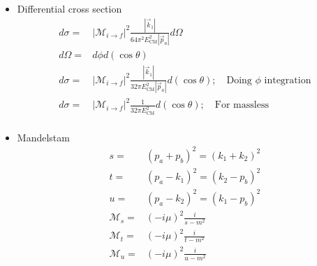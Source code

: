 \begin{itemize}
\begin{itemize}
            \item Differential cross section \cite{wells}
            \begin{equation}\begin{split}
            d\sigma=&|\mathcal{M}_{i\to f}|^2\frac{|\vec{k}_1|}{64\pi^2E^2_\text{CM}|\vec{p}_a|}d\Omega \\
            d\Omega=&d\phi d(\cos{\theta}) \\
            d\sigma=&|\mathcal{M}_{i\to f}|^2\frac{|\vec{k}_1|}{32\pi E^2_\text{CM}|\vec{p}_a|}d(\cos\theta)  ; \quad\text{Doing $\phi$ integration} \\
            d\sigma=&|\mathcal{M}_{i\to f}|^2\frac{1}{32\pi E^2_\text{CM}}d(\cos\theta) ; \quad\text{For massless} \\
            \end{split}\end{equation}
            \item Mandelstam \cite{wells}
            \begin{equation}\begin{split}
            s=&(p_a+p_b)^2=(k_1+k_2)^2 \\
            t=&(p_a-k_1)^2=(k_2-p_b)^2 \\
            u=&(p_a-k_2)^2=(k_1-p_b)^2 \\
            \mathcal{M}_s=&(-i\mu)^2\frac{i}{s-m^2} \\
            \mathcal{M}_t=&(-i\mu)^2\frac{i}{t-m^2} \\
            \mathcal{M}_u=&(-i\mu)^2\frac{i}{u-m^2} \\
            \end{split}\end{equation}
        \end{itemize}
\end{itemize}

